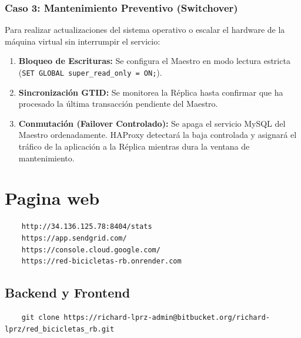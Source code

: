 \documentclass[10pt,a4paper]{article}
\begin{document}
\subsubsection*{Caso 3: Mantenimiento Preventivo (Switchover)}
Para realizar actualizaciones del sistema operativo o escalar el hardware de la máquina virtual sin interrumpir el servicio:
\begin{enumerate}
    \item \textbf{Bloqueo de Escrituras:} Se configura el Maestro en modo lectura estricta (\texttt{SET GLOBAL super\_read\_only = ON;}).
    \item \textbf{Sincronización GTID:} Se monitorea la Réplica hasta confirmar que ha procesado la última transacción pendiente del Maestro.
    \item \textbf{Conmutación (Failover Controlado):} Se apaga el servicio MySQL del Maestro ordenadamente. HAProxy detectará la baja controlada y asignará el tráfico de la aplicación a la Réplica mientras dura la ventana de mantenimiento.
\end{enumerate}

\newpage

\section{Pagina web}

\begin{lstlisting}
    http://34.136.125.78:8404/stats
    https://app.sendgrid.com/
    https://console.cloud.google.com/
    https://red-bicicletas-rb.onrender.com
\end{lstlisting}

\subsection{Backend y Frontend}

\begin{center}
    \href{https://bitbucket.org/richard-lprz/red_bicicletas_rb/src/main/}{
    }
\end{center}
\vspace{2mm}

\begin{lstlisting}
    git clone https://richard-lprz-admin@bitbucket.org/richard-lprz/red_bicicletas_rb.git
\end{lstlisting}
\end{document}
